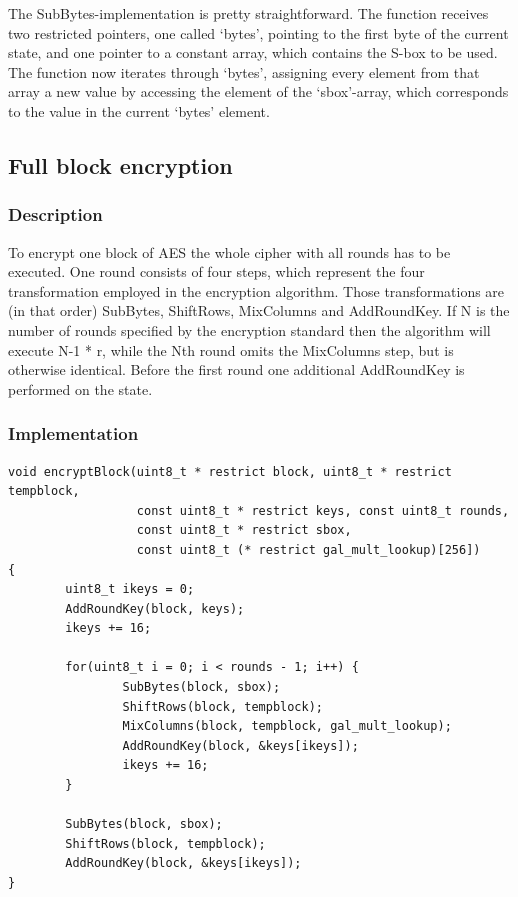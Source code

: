 The SubBytes-implementation is pretty straightforward. The function
receives two restricted pointers, one called `bytes', pointing to the
first byte of the current state, and one pointer to a constant array,
which contains the S-box to be used. The function now iterates through
`bytes', assigning every element from that array a new value by
accessing the element of the `sbox'-array, which corresponds to the
value in the current `bytes' element.

\hypertarget{full-block-encryption}{%
\subsection{Full block encryption}\label{full-block-encryption}}

\hypertarget{description-6}{%
\subsubsection{Description}\label{description-6}}

To encrypt one block of AES the whole cipher with all rounds has to be
executed. One round consists of four steps, which represent the four
transformation employed in the encryption algorithm. Those transformations are (in that order) SubBytes, ShiftRows, MixColumns and AddRoundKey.
If N is the number of rounds specified by the encryption standard then
the algorithm will execute N-1 * r, while the Nth round omits the
MixColumns step, but is otherwise identical. Before the first round one
additional AddRoundKey is performed on the state. \cite[ch. 5.1]{fips197}

\hypertarget{implementation-5}{%
\subsubsection{Implementation}\label{implementation-5}}

\begin{lstlisting}
void encryptBlock(uint8_t * restrict block, uint8_t * restrict tempblock,
                  const uint8_t * restrict keys, const uint8_t rounds,
                  const uint8_t * restrict sbox,
                  const uint8_t (* restrict gal_mult_lookup)[256])
{
        uint8_t ikeys = 0;
        AddRoundKey(block, keys);
        ikeys += 16;

        for(uint8_t i = 0; i < rounds - 1; i++) {
                SubBytes(block, sbox);
                ShiftRows(block, tempblock);
                MixColumns(block, tempblock, gal_mult_lookup);
                AddRoundKey(block, &keys[ikeys]);
                ikeys += 16;
        }

        SubBytes(block, sbox);
        ShiftRows(block, tempblock);
        AddRoundKey(block, &keys[ikeys]);
}
\end{lstlisting}

